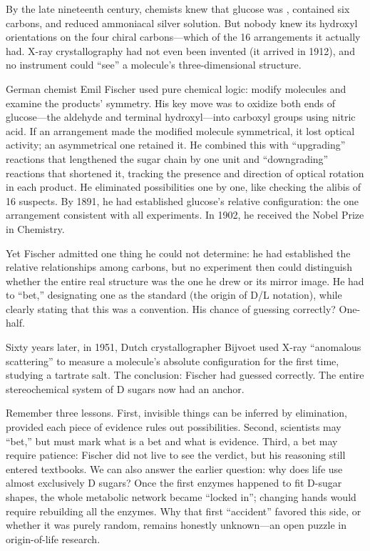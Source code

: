 \begin{zhengju}
By the late nineteenth century, chemists knew that glucose was , contained six carbons, and reduced ammoniacal silver solution. But nobody knew its hydroxyl orientations on the four chiral carbons---which of the 16 arrangements it actually had. X-ray crystallography had not even been invented (it arrived in 1912), and no instrument could ``see'' a molecule's three-dimensional structure.

German chemist Emil Fischer used pure chemical logic: modify molecules and examine the products' symmetry. His key move was to oxidize both ends of glucose---the aldehyde and terminal hydroxyl---into carboxyl groups using nitric acid. If an arrangement made the modified molecule symmetrical, it lost optical activity; an asymmetrical one retained it. He combined this with ``upgrading'' reactions that lengthened the sugar chain by one unit and ``downgrading'' reactions that shortened it, tracking the presence and direction of optical rotation in each product. He eliminated possibilities one by one, like checking the alibis of 16 suspects. By 1891, he had established glucose's relative configuration: the one arrangement consistent with all experiments. In 1902, he received the Nobel Prize in Chemistry.

Yet Fischer admitted one thing he could not determine: he had established the relative relationships among carbons, but no experiment then could distinguish whether the entire real structure was the one he drew or its mirror image. He had to ``bet,'' designating one as the standard (the origin of D/L notation), while clearly stating that this was a convention. His chance of guessing correctly? One-half.

Sixty years later, in 1951, Dutch crystallographer Bijvoet used X-ray ``anomalous scattering'' to measure a molecule's absolute configuration for the first time, studying a tartrate salt. The conclusion: Fischer had guessed correctly. The entire stereochemical system of D sugars now had an anchor.

Remember three lessons. First, invisible things can be inferred by elimination, provided each piece of evidence rules out possibilities. Second, scientists may ``bet,'' but must mark what is a bet and what is evidence. Third, a bet may require patience: Fischer did not live to see the verdict, but his reasoning still entered textbooks. We can also answer the earlier question: why does life use almost exclusively D sugars? Once the first enzymes happened to fit D-sugar shapes, the whole metabolic network became ``locked in''; changing hands would require rebuilding all the enzymes. Why that first ``accident'' favored this side, or whether it was purely random, remains honestly unknown---an open puzzle in origin-of-life research.
\end{zhengju}

